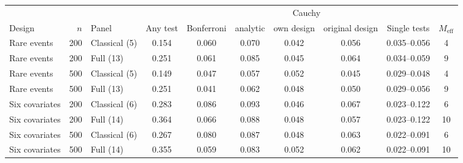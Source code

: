 \begin{tabular}{lrlccccccc}
\toprule
 & & & & & \multicolumn{3}{c}{Cauchy} & & \\
\cmidrule(lr){6-8}
Design & $n$ & Panel & Any test & Bonferroni & analytic & own design & original design & Single tests & $M_{\mathrm{eff}}$ \\
\midrule
Rare events & 200 & Classical (5) & 0.154 & 0.060 & 0.070 & 0.042 & 0.056 & 0.035--0.056 & 4 \\
Rare events & 200 & Full (13) & 0.251 & 0.061 & 0.085 & 0.045 & 0.064 & 0.034--0.059 & 9 \\
Rare events & 500 & Classical (5) & 0.149 & 0.047 & 0.057 & 0.052 & 0.045 & 0.029--0.048 & 4 \\
Rare events & 500 & Full (13) & 0.251 & 0.041 & 0.062 & 0.048 & 0.050 & 0.029--0.056 & 9 \\
Six covariates & 200 & Classical (6) & 0.283 & 0.086 & 0.093 & 0.046 & 0.067 & 0.023--0.122 & 6 \\
Six covariates & 200 & Full (14) & 0.364 & 0.066 & 0.088 & 0.048 & 0.057 & 0.023--0.122 & 10 \\
Six covariates & 500 & Classical (6) & 0.267 & 0.080 & 0.087 & 0.048 & 0.063 & 0.022--0.091 & 6 \\
Six covariates & 500 & Full (14) & 0.355 & 0.059 & 0.083 & 0.052 & 0.062 & 0.022--0.091 & 10 \\
\bottomrule
\end{tabular}